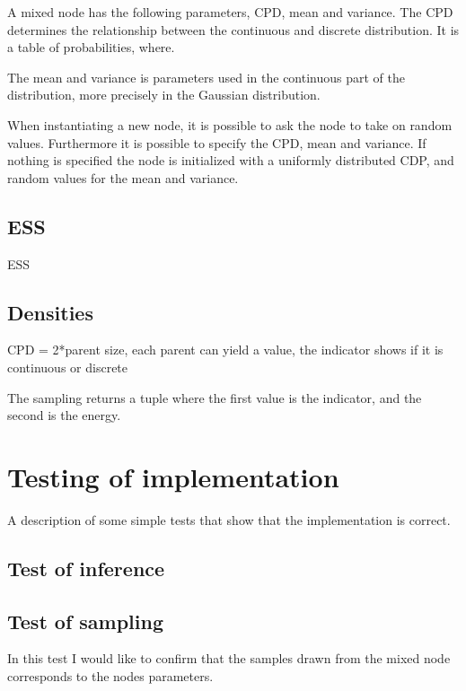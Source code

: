 \documentclass[10pt, conference, compsocconf,a4paper]{IEEEtran}
\begin{document}
A mixed node has the following parameters, CPD, mean and variance. The CPD determines the relationship between the continuous and discrete distribution. It is a table of probabilities, where.

The mean and variance is parameters used in the continuous part of the distribution, more precisely in the Gaussian distribution. 
                                                                                                                                  

When instantiating a new node, it is possible to ask the node to take on random values. Furthermore it is possible to specify the CPD, mean and variance. If nothing is specified the node is initialized with a uniformly distributed CDP, and random values for the mean and variance. 




\subsection{ESS} %
\label{sub:ess}
ESS

\subsection{Densities} %
\label{sub:densities}
CPD = 2*parent size, each parent can yield a value, the indicator shows if it is continuous or discrete

The sampling returns a tuple where the first value is the indicator, and the second is the energy.


\section{Testing of implementation} %
\label{sec:testing_of_implementation}

A description of some simple tests that show that the implementation is correct. 

\subsection{Test of inference} %
\label{sub:test_of_inference}


\subsection{Test of sampling} %
\label{sub:test_of_sampling}
In this test I would like to confirm that the samples drawn from the mixed node corresponds to the nodes parameters.
\end{document}
